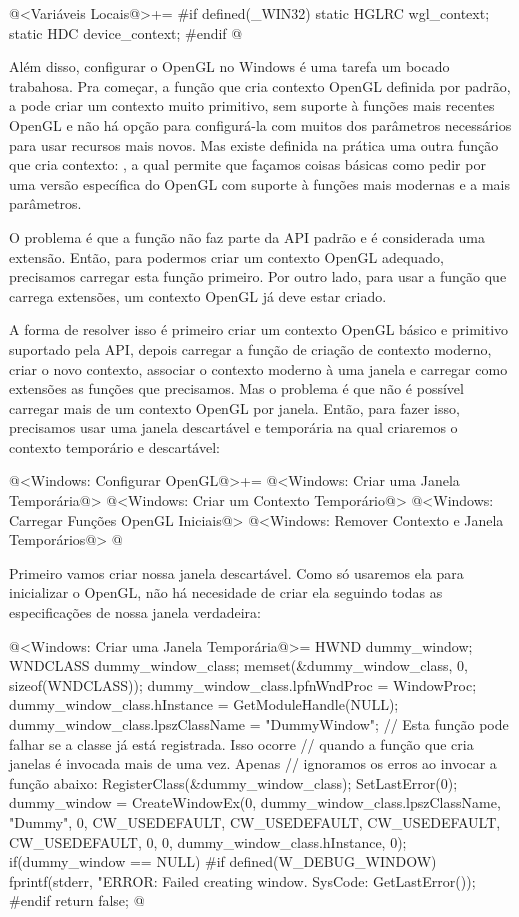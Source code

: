 \iniciocodigo
@<Variáveis Locais@>+=
#if defined(_WIN32)
static HGLRC wgl_context;
static HDC device_context;
#endif
@
\fimcodigo


Além disso, configurar o OpenGL no Windows é uma tarefa um bocado
trabahosa. Pra começar, a função que cria contexto OpenGL definida por
padrão, a  pode criar um contexto muito
primitivo, sem suporte à funções mais recentes OpenGL e não há opção
para configurá-la com muitos dos parâmetros necessários para usar
recursos mais novos. Mas existe definida na prática uma outra função
que cria contexto: , a qual
permite que façamos coisas básicas como pedir por uma versão
específica do OpenGL com suporte à funções mais modernas e a mais
parâmetros.

O problema é que a função  não
faz parte da API padrão e é considerada uma extensão. Então, para
podermos criar um contexto OpenGL adequado, precisamos carregar esta
função primeiro. Por outro lado, para usar a função que carrega
extensões, um contexto OpenGL já deve estar criado.

A forma de resolver isso é primeiro criar um contexto OpenGL básico e
primitivo suportado pela API, depois carregar a função de criação de
contexto moderno, criar o novo contexto, associar o contexto moderno à
uma janela e carregar como extensões as funções que precisamos. Mas o
problema é que não é possível carregar mais de um contexto OpenGL por
janela. Então, para fazer isso, precisamos usar uma janela descartável
e temporária na qual criaremos o contexto temporário e descartável:

\iniciocodigo
@<Windows: Configurar OpenGL@>+=
{
@<Windows: Criar uma Janela Temporária@>
@<Windows: Criar um Contexto Temporário@>
@<Windows: Carregar Funções OpenGL Iniciais@>
@<Windows: Remover Contexto e Janela Temporários@>
}
@
\fimcodigo

Primeiro vamos criar nossa janela descartável. Como só usaremos ela
para inicializar o OpenGL, não há necesidade de criar ela seguindo
todas as especificações de nossa janela verdadeira:

\iniciocodigo
@<Windows: Criar uma Janela Temporária@>=
HWND dummy_window;
{
  WNDCLASS dummy_window_class;
  memset(&dummy_window_class, 0, sizeof(WNDCLASS));
  dummy_window_class.lpfnWndProc = WindowProc;
  dummy_window_class.hInstance = GetModuleHandle(NULL);
  dummy_window_class.lpszClassName = "DummyWindow";
  // Esta função pode falhar se a classe já está registrada. Isso ocorre
  // quando a função que cria janelas é invocada mais de uma vez. Apenas
  // ignoramos os erros ao invocar a função abaixo:
  RegisterClass(&dummy_window_class);
  SetLastError(0);
  dummy_window = CreateWindowEx(0, dummy_window_class.lpszClassName, "Dummy",
                                0, CW_USEDEFAULT, CW_USEDEFAULT, CW_USEDEFAULT,
                                CW_USEDEFAULT, 0, 0,
                                dummy_window_class.hInstance, 0);
  if(dummy_window == NULL){
#if defined(W_DEBUG_WINDOW)
    fprintf(stderr, "ERROR: Failed creating window. SysCode: %
            GetLastError());
#endif
    return false;
  }
}
@
\fimcodigo

